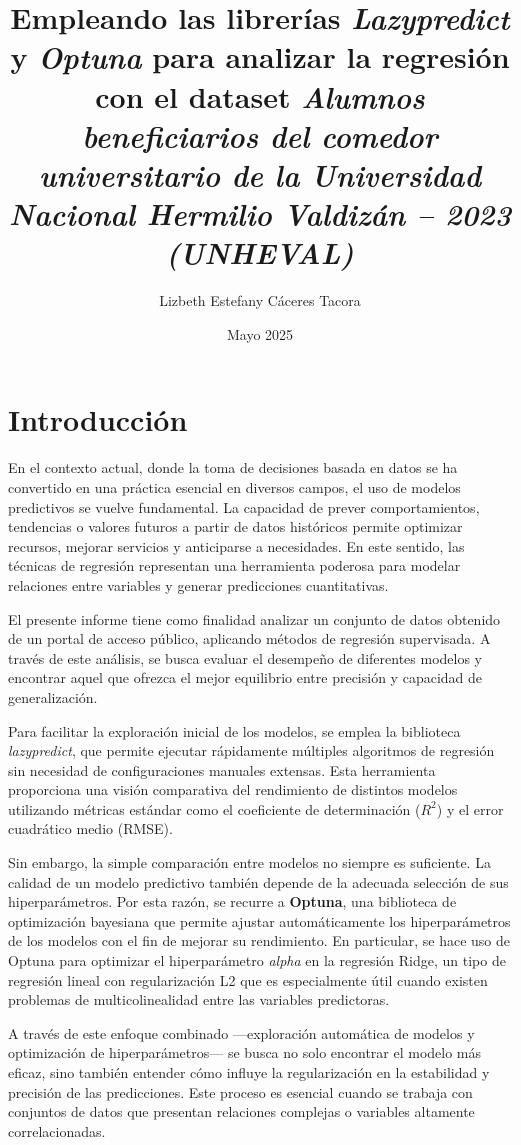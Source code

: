 \documentclass{article}
\title{Empleando las librerías \textit{Lazypredict} y \textit{Optuna} para analizar la regresión con el dataset \textit{Alumnos beneficiarios del comedor universitario de la Universidad Nacional Hermilio Valdizán – 2023 (UNHEVAL)}}
\author{Lizbeth Estefany Cáceres Tacora}
\date{Mayo 2025}
\begin{document}
\maketitle
\section{Introducción}

En el contexto actual, donde la toma de decisiones basada en datos se ha convertido en una práctica esencial en diversos campos, el uso de modelos predictivos se vuelve fundamental. La capacidad de prever comportamientos, tendencias o valores futuros a partir de datos históricos permite optimizar recursos, mejorar servicios y anticiparse a necesidades. En este sentido, las técnicas de regresión representan una herramienta poderosa para modelar relaciones entre variables y generar predicciones cuantitativas.

El presente informe tiene como finalidad analizar un conjunto de datos obtenido de un portal de acceso público, aplicando métodos de regresión supervisada. A través de este análisis, se busca evaluar el desempeño de diferentes modelos y encontrar aquel que ofrezca el mejor equilibrio entre precisión y capacidad de generalización.

Para facilitar la exploración inicial de los modelos, se emplea la biblioteca \textit{lazypredict}, que permite ejecutar rápidamente múltiples algoritmos de regresión sin necesidad de configuraciones manuales extensas. Esta herramienta proporciona una visión comparativa del rendimiento de distintos modelos utilizando métricas estándar como el coeficiente de determinación ($R^2$) y el error cuadrático medio (RMSE).

Sin embargo, la simple comparación entre modelos no siempre es suficiente. La calidad de un modelo predictivo también depende de la adecuada selección de sus hiperparámetros. Por esta razón, se recurre a \textbf{Optuna}, una biblioteca de optimización bayesiana que permite ajustar automáticamente los hiperparámetros de los modelos con el fin de mejorar su rendimiento. En particular, se hace uso de Optuna para optimizar el hiperparámetro \textit{alpha} en la regresión Ridge, un tipo de regresión lineal con regularización L2 que es especialmente útil cuando existen problemas de multicolinealidad entre las variables predictoras.

A través de este enfoque combinado —exploración automática de modelos y optimización de hiperparámetros— se busca no solo encontrar el modelo más eficaz, sino también entender cómo influye la regularización en la estabilidad y precisión de las predicciones. Este proceso es esencial cuando se trabaja con conjuntos de datos que presentan relaciones complejas o variables altamente correlacionadas.
\end{document}
